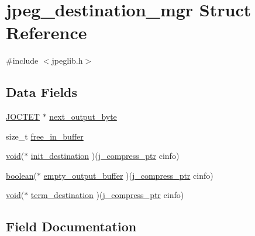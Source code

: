 \hypertarget{structjpeg__destination__mgr}{}\section{jpeg\+\_\+destination\+\_\+mgr Struct Reference}
\label{structjpeg__destination__mgr}


{\ttfamily \#include $<$jpeglib.\+h$>$}

\subsection*{Data Fields}
\begin{DoxyCompactItemize}
\item 
\hyperlink{jmorecfg_8h_a356ad249f20e691b520da439f92cccbc}{J\+O\+C\+T\+ET} $\ast$ \hyperlink{structjpeg__destination__mgr_a3dac0ab8cc4daeb1efb9fea2e07449c0}{next\+\_\+output\+\_\+byte}
\item 
size\+\_\+t \hyperlink{structjpeg__destination__mgr_a397cc63a089447fe96e35062c4979906}{free\+\_\+in\+\_\+buffer}
\item 
\hyperlink{png_8h_ac9c84fa68bbad002983e35ce3663c686}{void}($\ast$ \hyperlink{structjpeg__destination__mgr_ad9e0d51fc2c21a6fdb96d33922b8ed4a}{init\+\_\+destination} )(\hyperlink{jpeglib_8h_add2a072c54e3a51550f4975f7ddb91e7}{j\+\_\+compress\+\_\+ptr} cinfo)
\item 
\hyperlink{jconfig_8h_a7670a4e8a07d9ebb00411948b0bbf86d}{boolean}($\ast$ \hyperlink{structjpeg__destination__mgr_a72680fe2881c6f61a0dec16d5694c452}{empty\+\_\+output\+\_\+buffer} )(\hyperlink{jpeglib_8h_add2a072c54e3a51550f4975f7ddb91e7}{j\+\_\+compress\+\_\+ptr} cinfo)
\item 
\hyperlink{png_8h_ac9c84fa68bbad002983e35ce3663c686}{void}($\ast$ \hyperlink{structjpeg__destination__mgr_a25c1b010db7e6fe8bb7139ecfd07b800}{term\+\_\+destination} )(\hyperlink{jpeglib_8h_add2a072c54e3a51550f4975f7ddb91e7}{j\+\_\+compress\+\_\+ptr} cinfo)
\end{DoxyCompactItemize}


\subsection{Field Documentation}
\mbox{\label{structjpeg__destination__mgr_a72680fe2881c6f61a0dec16d5694c452}} 
